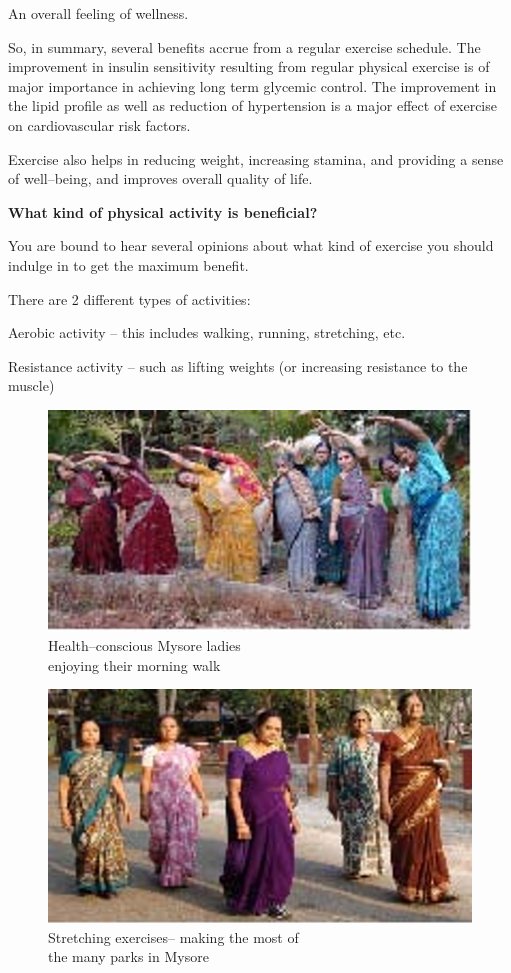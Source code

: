  \item An overall feeling of wellness.

So, in summary, several benefits accrue from a regular exercise schedule. The improvement in insulin sensitivity resulting from regular physical exercise is of major importance in achieving long term glycemic control. The improvement in the lipid profile as well as reduction of hypertension is a major effect of exercise on cardiovascular risk factors.

Exercise also helps in reducing weight, increasing stamina, and providing a sense of well–being, and improves overall quality of life.

\textbf{What kind of physical activity is beneficial?}

You are bound to hear several opinions about what kind of exercise you should indulge in to get the maximum benefit.

There are 2 different types of activities:

\item Aerobic activity – this includes walking, running, stretching, etc.

 \item Resistance activity – such as lifting weights (or increasing resistance to the muscle)


\begin{figure}
\includegraphics{images/084.jpg}
\caption{Health–conscious Mysore ladies\\ enjoying their morning walk}
\end{figure}


\begin{figure}
\includegraphics{images/085.jpg}
\caption{Stretching exercises– making the most of\\ the many parks in Mysore}
\end{figure}


